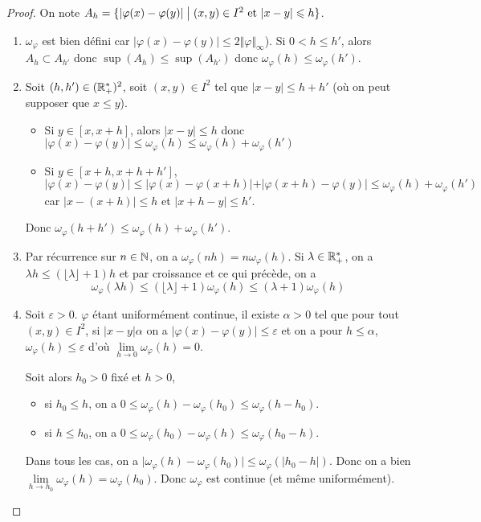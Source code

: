 \begin{proof}
	On note $A_{h}=\{\vert\varphi(x)-\varphi(y)\vert\bigm|(x,y)\in I^{2}\text{ et }\vert x-y\vert\leqslant h\}$.
	\begin{enumerate}
		\item $\omega_{\varphi}$ est bien défini car $\vert\varphi(x)-\varphi(y)\vert\leqslant 2\Vert\varphi\Vert_{\infty}$). Si $0<h\leqslant h'$, alors $A_{h}\subset A_{h'}$ donc $\sup(A_{h})\leqslant\sup(A_{h'})$ donc $\omega_{\varphi}(h)\leqslant\omega_{\varphi}(h')$.
		\item Soit $(h,h')\in(\mathbb{R}_{+}^{*})^{2}$, soit $(x,y)\in I^{2}$ tel que $\vert x-y\vert\leqslant h+h'$ (où on peut supposer que $x\leqslant y$).
		\begin{itemize}
			\item Si $y\in[x,x+h]$, alors $\vert x-y\vert\leqslant h$ donc $\vert\varphi(x)-\varphi(y)\vert\leqslant\omega_{\varphi}(h)\leqslant\omega_\varphi(h)+\omega_{\varphi}(h')$
			\item Si $y\in[x+h,x+h+h']$, $\vert\varphi(x)-\varphi(y)\vert\leqslant\vert\varphi(x)-\varphi(x+h)\vert+\vert\varphi(x+h)-\varphi(y)\vert\leqslant\omega_\varphi(h)+\omega_{\varphi}(h')$ car $\vert x-(x+h)\vert\leqslant h$ et $\vert x+h-y\vert\leqslant h'$.
		\end{itemize}
		Donc $\omega_{\varphi}(h+h')\leqslant\omega_\varphi(h)+\omega_\varphi(h')$.
		\item Par récurrence sur $n\in\mathbb{N}$, on a $\omega_\varphi(nh)=n\omega_\varphi(h)$. Si $\lambda\in\mathbb{R}_{+}^{*}$, on a $\lambda h\leqslant(\lfloor \lambda\rfloor+1)h$ et par croissance et ce qui précède, on a 
		\begin{equation}\omega_\varphi(\lambda h)\leqslant(\lfloor\lambda\rfloor+1)\omega_\varphi(h)\leqslant(\lambda+1)\omega_\varphi(h)\end{equation}
		\item Soit $\varepsilon>0$. $\varphi$ étant uniformément continue, il existe $\alpha>0$ tel que pour tout $(x,y)\in I^{2}$, si $\vert x-y\vert\alpha$ on a $\vert\varphi(x)-\varphi(y)\vert\leqslant\varepsilon$ et on a pour $h\leqslant\alpha$, $\omega_\varphi(h)\leqslant\varepsilon$ d'où $\lim\limits_{h\to0}\omega_\varphi(h)=0$.
		
		Soit alors $h_{0}>0$ fixé et $h>0$,
		\begin{itemize}
			\item si $h_{0}\leqslant h$, on a $0\leqslant\omega_\varphi(h)-\omega_\varphi(h_0)\leqslant\omega_\varphi(h-h_0)$.
			\item si $h\leqslant h_{0}$, on a $0\leqslant\omega_\varphi(h_0)-\omega_\varphi(h)\leqslant\omega_\varphi(h_0-h)$.
		\end{itemize}
		Dans tous les cas, on a $\vert\omega_\varphi(h)-\omega_\varphi(h_{0})\vert\leqslant\omega_\varphi(\vert h_{0}-h\vert)$. Donc on a bien $\lim\limits_{h\to h_{0}}\omega_\varphi(h)=\omega_\varphi(h_{0})$. Donc $\omega_{\varphi}$ est continue (et même uniformément).
	\end{enumerate}
\end{proof}

